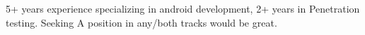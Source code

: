 

\begin{cvparagraph}

5+ years experience specializing in android development, 2+ years in Penetration testing. Seeking A position in any/both tracks would be great.
\end{cvparagraph}
